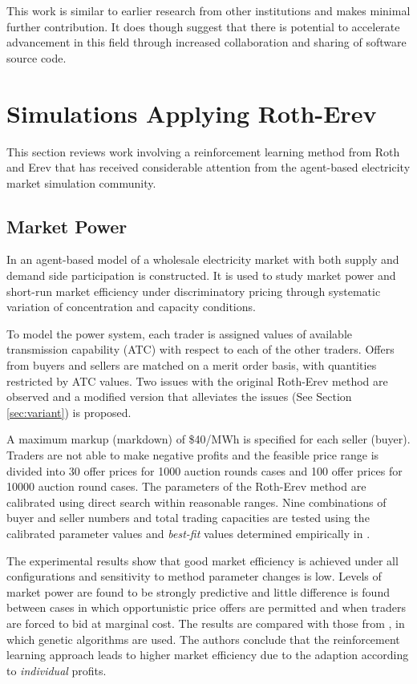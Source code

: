 This work is similar to earlier research from other institutions
\cite{wang:09,krause:nash06} and makes minimal further contribution.  It does
though suggest that there is potential to accelerate advancement in this field
through increased collaboration and sharing of software source code.

\section{Simulations Applying Roth-Erev}
This section reviews work involving a reinforcement learning method from Roth
and Erev that has received considerable attention from the agent-based
electricity market simulation community.

\subsection{Market Power}
In  an agent-based model of a wholesale electricity
market with both supply and demand side participation is constructed.  It is
used to study market power and short-run market efficiency under discriminatory
pricing through systematic variation of concentration and capacity conditions.

To model the power system, each trader is assigned values of available
transmission capability (ATC) with respect to each of the other traders. Offers
from buyers and sellers are matched on a merit order basis, with quantities
restricted by ATC values.  Two issues with the original Roth-Erev method are
observed and a modified version that alleviates the issues (See Section
\ref{sec:variant}) is proposed.

A maximum markup (markdown) of \$40/MWh is specified for each seller (buyer).
Traders are not able to make negative profits and the feasible price range is
divided into 30 offer prices for 1000 auction rounds cases and 100 offer prices
for 10000 auction round cases.  The parameters of the Roth-Erev method are
calibrated using direct search within reasonable ranges.  Nine combinations of
buyer and seller numbers and total trading capacities are tested using the
calibrated parameter values and \textit{best-fit} values determined empirically
in .

The experimental results show that good market efficiency is achieved under all
configurations and sensitivity to method parameter changes is low.  Levels of
market power are found to be strongly predictive and little difference is found
between cases in which opportunistic price offers are permitted and when traders
are forced to bid at marginal cost.  The results are compared with those from
, in which genetic algorithms are used.  The authors
conclude that the reinforcement learning approach leads to higher market
efficiency due to the adaption according to \textit{individual} profits.

